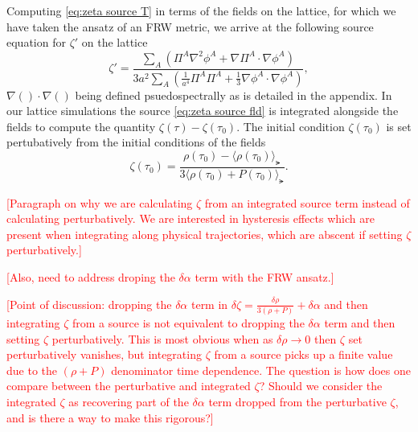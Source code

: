 Computing \eqref{eq:zeta source T} in terms of the fields on the lattice, for which we have taken the ansatz of an FRW metric, we arrive at the following source equation for $\zeta'$ on the lattice
\begin{equation} \label{eq:zeta source fld}
  \zeta' = \frac{\sum_A\left(\Pi^A\nabla^2\phi^A + \nabla\Pi^A\cdot\nabla\phi^A\right)}{3a^2\sum_A\left(\frac{1}{a^4}\Pi^A\Pi^A + \frac{1}{3}\nabla\phi^A\cdot\nabla\phi^A \right)},
\end{equation}
$\nabla()\cdot\nabla()$ being defined psuedospectrally as is detailed in the appendix.
In our lattice simulations the source \eqref{eq:zeta source fld} is integrated alongside the fields to compute the quantity $\zeta(\tau) - \zeta(\tau_0)$.
The initial condition $\zeta(\tau_0)$ is set pertubatively from the initial conditions of the fields
\begin{equation}
  \zeta(\tau_0) = \frac{\rho(\tau_0)-\langle\rho(\tau_0)\rangle_\lat}{3\langle\rho(\tau_0)+P(\tau_0)\rangle_\lat}.
\end{equation}

\textcolor{red}{[Paragraph on why we are calculating $\zeta$ from an integrated source term instead of calculating perturbatively. We are interested in hysteresis effects which are present when integrating along physical trajectories, which are abscent if setting $\zeta$ perturbatively.]}

\textcolor{red}{[Also, need to address droping the $\delta\alpha$ term with the FRW ansatz.]}

\textcolor{red}{[Point of discussion: dropping the $\delta\alpha$ term in $\delta\zeta = \frac{\delta\rho}{3(\rho + P)} + \delta\alpha$ and then integrating $\zeta$ from a source is not equivalent to dropping the $\delta\alpha$ term and then setting $\zeta$ perturbatively. This is most obvious when as $\delta\rho \to 0$ then $\zeta$ set perturbatively vanishes, but integrating $\zeta$ from a source picks up a finite value due to the $(\rho+P)$ denominator time dependence.
    The question is how does one compare between the perturbative and integrated $\zeta$? Should we consider the integrated $\zeta$ as recovering part of the $\delta\alpha$ term dropped from the perturbative $\zeta$, and is there a way to make this rigorous?]}


